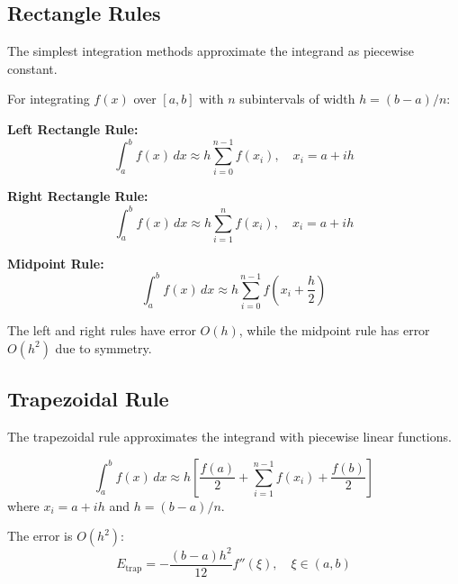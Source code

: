

\subsection{Rectangle Rules}

The simplest integration methods approximate the integrand as piecewise constant.

\begin{definitionbox}[title=Definition 11.7: Rectangle Rules]
For integrating $f(x)$ over $[a, b]$ with $n$ subintervals of width $h = (b-a)/n$:

\textbf{Left Rectangle Rule:}
\begin{equation}
\int_a^b f(x)\,dx \approx h \sum_{i=0}^{n-1} f(x_i), \quad x_i = a + ih
\end{equation}

\textbf{Right Rectangle Rule:}
\begin{equation}
\int_a^b f(x)\,dx \approx h \sum_{i=1}^{n} f(x_i), \quad x_i = a + ih
\end{equation}

\textbf{Midpoint Rule:}
\begin{equation}
\int_a^b f(x)\,dx \approx h \sum_{i=0}^{n-1} f\left(x_i + \frac{h}{2}\right)
\end{equation}
\end{definitionbox}

The left and right rules have error $O(h)$, while the midpoint rule has error $O(h^2)$ due to symmetry.

\subsection{Trapezoidal Rule}

The trapezoidal rule approximates the integrand with piecewise linear functions.

\begin{definitionbox}[title=Definition 11.8: Trapezoidal Rule]
\begin{equation}
\boxed{\int_a^b f(x)\,dx \approx h\left[\frac{f(a)}{2} + \sum_{i=1}^{n-1} f(x_i) + \frac{f(b)}{2}\right]}
\end{equation}
where $x_i = a + ih$ and $h = (b-a)/n$.

The error is $O(h^2)$:
\begin{equation}
E_{\text{trap}} = -\frac{(b-a)h^2}{12} f''(\xi), \quad \xi \in (a, b)
\end{equation}
\end{definitionbox}

